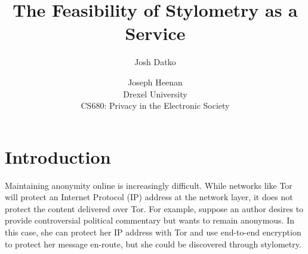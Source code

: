 \documentclass[letterpaper]{article}
\begin{document}

\setcounter{secnumdepth}{1}
\title{The Feasibility of Stylometry as a Service}
\author{Josh Datko \and Joseph Heenan\\ Drexel University\\
CS680: Privacy in the Electronic Society\\
}
\maketitle

\section*{Introduction}\label{sec:intro}


Maintaining anonymity online is increasingly difficult.  While
networks like Tor \cite{Dingledine04tor:the} will protect an Internet
Protocol (IP) address at the network layer, it does not protect the
content delivered over Tor.  For example, suppose an author desires to
provide controversial political commentary but wants to remain
anonymous.  In this case, she can protect her IP address with Tor and
use end-to-end encryption to protect her message en-route, but she
could be discovered through stylometry.
\end{document}
